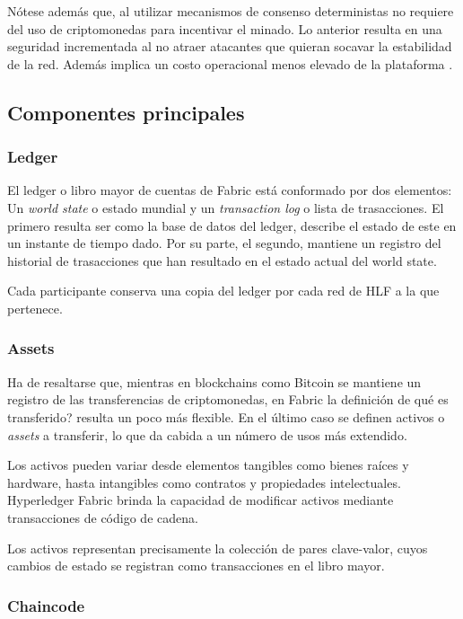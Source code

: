N\'otese adem\'as que, al utilizar mecanismos de consenso deterministas no requiere del uso de criptomonedas para incentivar el minado. Lo anterior resulta en una seguridad incrementada al no atraer atacantes que quieran socavar la estabilidad de la red. Adem\'as implica un costo operacional menos elevado de la plataforma .

\subsection{Componentes principales}

\subsubsection{Ledger}
El ledger o libro mayor de cuentas de Fabric est\'a conformado por dos elementos: Un \emph{world state} o estado mundial y un \emph{transaction log} o lista de trasacciones. El primero resulta ser como la base de datos del ledger, describe el estado de este en un instante de tiempo dado. Por su parte, el segundo, mantiene un registro del historial de trasacciones que han resultado en el estado actual del world state.

Cada participante conserva una copia del ledger por cada red de HLF  a la que pertenece.

\subsubsection{Assets}
Ha de resaltarse que, mientras en blockchains como Bitcoin se mantiene un registro de las transferencias de criptomonedas, en Fabric la definici\'on de \textquestiondown qu\'e es transferido? resulta un poco m\'as flexible. En el \'ultimo caso se definen activos o \emph{assets} a transferir, lo que da cabida a un n\'umero de usos m\'as extendido.

Los activos pueden variar desde elementos tangibles como bienes ra\'ices y hardware, hasta intangibles como contratos y propiedades intelectuales. Hyperledger Fabric brinda la capacidad de modificar activos mediante transacciones de c\'odigo de cadena.

Los activos representan precisamente la colecci\'on de pares clave-valor, cuyos cambios de estado se registran como transacciones en el libro mayor.

\subsubsection{Chaincode}

